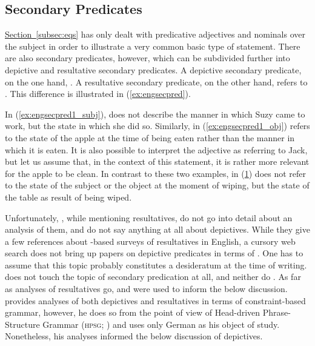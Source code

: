 \subsection{Secondary Predicates}
\label{subsec:secpred}

\hyperref[subsec:eqs]{Section~\ref*{subsec:eqs}} has only dealt with
predicative adjectives and nominals over the subject in order to illustrate a
very common basic type of statement. There are also secondary predicates,
however, which can be subdivided further into depictive and resultative
secondary predicates. A depictive secondary predicate, on the one hand,
. A resultative secondary predicate, on the other hand, refers to
. This difference is illustrated in (\ref{ex:engsecpred}).

\begin{figure}[h]
\pex\label{ex:engsecpred}
\a\label{ex:engsecpred1_subj}%

\a\label{ex:engsecpred1_obj}%

\a\label{ex:engsecpred2_obj}%
\xe
\end{figure}

In (\ref{ex:engsecpred1_subj}),  does not describe the manner in which
Suzy came to work, but the state in which she did so. Similarly,
 in (\ref{ex:engsecpred1_obj}) refers to the state of the apple at
the time of being eaten rather than the manner in which it is eaten. It is also
possible to interpret the adjective as referring to Jack, but let us assume
that, in the context of this statement, it is rather more relevant for the
apple to be clean. In contrast to these two examples,  in
(\ref{ex:engsecpred2_obj}) does not refer to the state of the subject or the
object at the moment of wiping, but the state of the table as result of being
wiped.

Unfortunately, \citet[347]{bresnan2016}, while mentioning resultatives, do not
go into detail about an \Lfg{} analysis of them, and do not say anything at all
about depictives. While they give a few references about \Lfg{}-based surveys
of resultatives in English, a cursory web search does not bring up papers on
depictive predicates in terms of \Lfg{}. One has to assume that this topic
probably constitutes a desideratum at the time of writing.
\citet{dalrymple2001} does not touch the topic of secondary predication at all,
and neither do \citet{butt1999}. As far as \Lfg{} analyses of resultatives go,
\citet{simpson1983} and \citet{christie2013} were used to inform the below
discussion. \textcites{mueller2002} provides analyses of both depictives and
resultatives in terms of constraint-based grammar, however, he does so from the
point of view of Head-driven Phrase-Structure Grammar (\textsc{hpsg};
\cite{pollardsag1994}) and uses only German as his object of study.
Nonetheless, his analyses informed the below discussion of depictives.

